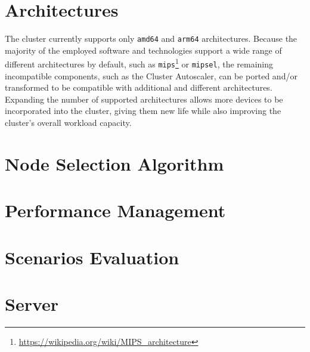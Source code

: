 \section{Architectures}
\label{subsec:conclusions_limitations_and_future_works_architectures}

The cluster currently supports only \texttt{amd64} and \texttt{arm64} architectures.
Because the majority of the employed software and technologies support a wide
range of different architectures by default, such as \texttt{mips}\footnote{\url{https://wikipedia.org/wiki/MIPS_architecture}}
or \texttt{mipsel}, the remaining incompatible components, such as the Cluster Autoscaler,
can be ported and/or transformed to be compatible with additional and different
architectures. \\ %
Expanding the number of supported architectures allows more devices to be
incorporated into the cluster, giving them new life while also improving the cluster's
overall workload capacity.

\section{Node Selection Algorithm}
\label{subsec:conclusions_limitations_and_future_works_node_selection_algorithm}

\section{Performance Management}
\label{subsec:conclusions_limitations_and_future_works_performance_management}

\section{Scenarios Evaluation}
\label{subsec:conclusions_limitations_and_future_works_scenarios_evaluation}


\section{Server}
\label{subsec:conclusions_limitations_and_future_works_server}




